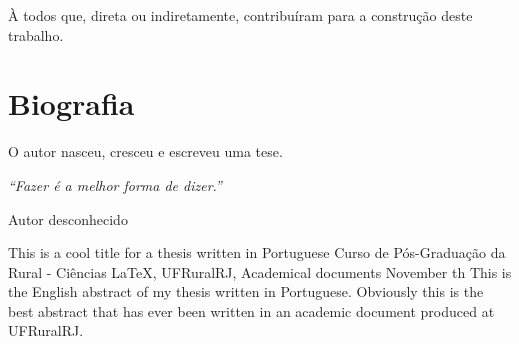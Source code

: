 \documentclass[tese]{UFRuralRJ}
\begin{document}
À todos que, direta ou indiretamente, contribuíram para a construção deste 
trabalho.


\chapter*{Biografia}
O autor nasceu, cresceu e escreveu uma tese.


\clearpage\mbox{}\vfill\hspace{80mm}\begin{minipage}{76mm}\begin{flushright}{\em
``Fazer é a melhor forma de dizer.''
\par
Autor desconhecido
}\end{flushright}\end{minipage}

\generalabstracttrue
\begin{abstract}
Este é o resumo em português de minha tese escrita em português. Claramente, 
este é o melhor resumo que já foi escrito em um documento acadêmico produzido na
UFRuralRJ.
\end{abstract}


\generalabstracttrue
\begin{englishabstract}
{This is a cool title for a thesis written in Portuguese} %
{Curso de Pós-Graduação da Rural - Ciências} %
{LaTeX, UFRuralRJ, Academical documents} %
{November} %
{th} %
This is the English abstract of my thesis written in Portuguese. Obviously this
is the best abstract that has ever been written in an academic document produced
at UFRuralRJ.
\end{englishabstract}
\end{document}

